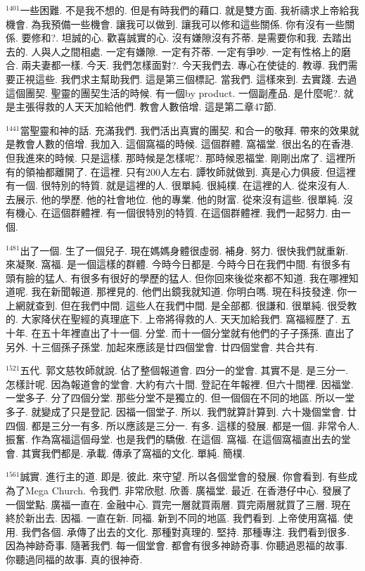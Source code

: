 \documentclass{book}
\begin{document}
$^{1401}$一些困難.
不是我不想的.
但是有時我們的藉口.
就是雙方面.
我祈禱求上帝給我機會.
為我預備一些機會.
讓我可以做到.
讓我可以修和這些關係.
你有沒有一些關係.
要修和?.
坦誠的心.
歡喜誠實的心.
沒有嫌隙沒有芥蒂.
是需要你和我.
去踏出去的.
人與人之間相處.
一定有嫌隙.
一定有芥蒂.
一定有爭吵.
一定有性格上的磨合.
兩夫妻都一樣.
今天.
我們怎樣面對?.
今天我們去.
專心在使徒的.
教導.
我們需要正視這些.
我們求主幫助我們.
這是第三個標記.
當我們.
這樣來到.
去實踐.
去過這個團契.
聖靈的團契生活的時候.
有一個by product.
一個副產品.
是什麼呢?.
就是主張得救的人天天加給他們.
教會人數倍增.
這是第二章47節.

$^{1441}$當聖靈和神的話.
充滿我們.
我們活出真實的團契.
和合一的敬拜.
帶來的效果就是教會人數的倍增.
我加入.
這個窩福的時候.
這個群體.
窩福堂.
很出名的在香港.
但我進來的時候.
只是這樣.
那時候是怎樣呢?.
那時候恩福堂.
剛剛出席了.
這裡所有的領袖都離開了.
在這裡.
只有200人左右.
譚牧師就做到.
真是心力俱疲.
但這裡有一個.
很特別的特質.
就是這裡的人.
很單純.
很純樸.
在這裡的人.
從來沒有人.
去展示.
他的學歷.
他的社會地位.
他的專業.
他的財富.
從來沒有這些.
很單純.
沒有機心.
在這個群體裡.
有一個很特別的特質.
在這個群體裡.
我們一起努力.
由一個.

$^{1481}$出了一個.
生了一個兒子.
現在媽媽身體很虛弱.
補身.
努力.
很快我們就重新.
來凝聚.
窩福.
是一個這樣的群體.
今時今日都是.
今時今日在我們中間.
有很多有頭有臉的猛人.
有很多有很好的學歷的猛人.
但你回來後從來都不知道.
我在哪裡知道呢.
我在新聞報道.
那裡見的.
他們出鏡我就知道.
你明白嗎.
現在科技發達.
你一上網就查到.
但在我們中間.
這些人在我們中間.
是全部都.
很謙和.
很單純.
很受教的.
大家降伏在聖經的真理底下.
上帝將得救的人.
天天加給我們.
窩福經歷了.
五十年.
在五十年裡直出了十一個.
分堂.
而十一個分堂就有他們的子子孫孫.
直出了另外.
十三個孫子孫堂.
加起來應該是廿四個堂會.
廿四個堂會.
共合共有.

$^{1521}$五代.
郭文慈牧師就說.
佔了整個報道會.
四分一的堂會.
其實不是.
是三分一.
怎樣計呢.
因為報道會的堂會.
大約有六十間.
登記在年報裡.
但六十間裡.
因福堂.
一堂多子.
分了四個分堂.
那些分堂不是獨立的.
但一個個在不同的地區.
所以一堂多子.
就變成了只是登記.
因福一個堂子.
所以.
我們就算計算到.
六十幾個堂會.
廿四個.
都是三分一有多.
所以應該是三分一.
有多.
這樣的發展.
都是一個.
非常令人.
振奮.
作為窩福這個母堂.
也是我們的驕傲.
在這個.
窩福.
在這個窩福直出去的堂會.
其實我們都是.
承載.
傳承了窩福的文化.
單純.
簡樸.

$^{1561}$誠實.
進行主的道.
即是.
彼此.
來守望.
所以各個堂會的發展.
你會看到.
有些成為了Mega Church.
令我們.
非常欣慰.
欣善.
廣福堂.
最近.
在香港仔中心.
發展了一個堂點.
廣福一直在.
金融中心.
買完一層就買兩層.
買完兩層就買了三層.
現在終於新出去.
因福.
一直在新.
同福.
新到不同的地區.
我們看到.
上帝使用窩福.
使用.
我們各個.
承傳了出去的文化.
那種對真理的.
堅持.
那種專注.
我們看到很多.
因為神跡奇事.
隨著我們.
每一個堂會.
都會有很多神跡奇事.
你聽過恩福的故事.
你聽過同福的故事.
真的很神奇.
\end{document}
